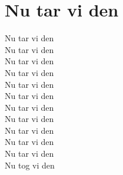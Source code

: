 \section{Nu tar vi den}
Nu tar vi den\\
Nu tar vi den\\
Nu tar vi den\\
Nu tar vi den\\

Nu tar vi den\\
Nu tar vi den\\
Nu tar vi den\\
Nu tar vi den\\

Nu tar vi den\\
Nu tar vi den\\
Nu tar vi den\\
Nu tog vi den\\
